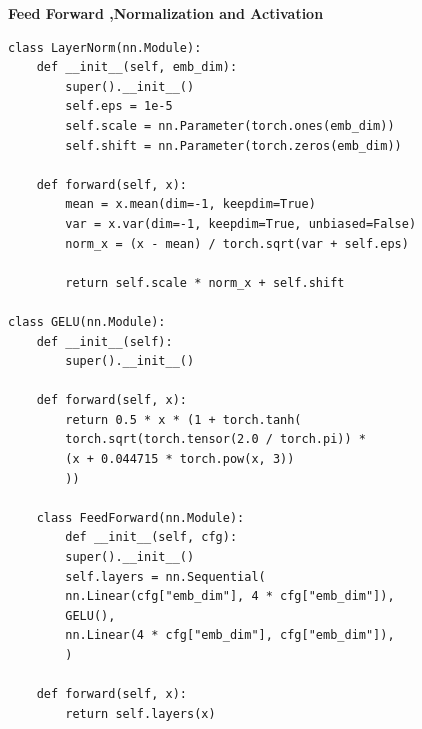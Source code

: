 \lstset{
	language=Python,
    basicstyle=\rmfamily\small, %
	breaklines=true,
	showstringspaces=false,
	frame=single,
	tabsize=3
}

\textbf{Feed Forward ,Normalization and Activation}

\begin{lstlisting}
class LayerNorm(nn.Module):
	def __init__(self, emb_dim):
		super().__init__()
		self.eps = 1e-5
		self.scale = nn.Parameter(torch.ones(emb_dim))
		self.shift = nn.Parameter(torch.zeros(emb_dim))
	
	def forward(self, x):
		mean = x.mean(dim=-1, keepdim=True)
		var = x.var(dim=-1, keepdim=True, unbiased=False)
		norm_x = (x - mean) / torch.sqrt(var + self.eps)
		
		return self.scale * norm_x + self.shift

class GELU(nn.Module):
	def __init__(self):
		super().__init__()

	def forward(self, x):
		return 0.5 * x * (1 + torch.tanh(
		torch.sqrt(torch.tensor(2.0 / torch.pi)) *
		(x + 0.044715 * torch.pow(x, 3))
		))

	class FeedForward(nn.Module):
		def __init__(self, cfg):
		super().__init__()
		self.layers = nn.Sequential(
		nn.Linear(cfg["emb_dim"], 4 * cfg["emb_dim"]),
		GELU(),
		nn.Linear(4 * cfg["emb_dim"], cfg["emb_dim"]),
		)

	def forward(self, x):
		return self.layers(x)
\end{lstlisting}
\pagebreak





